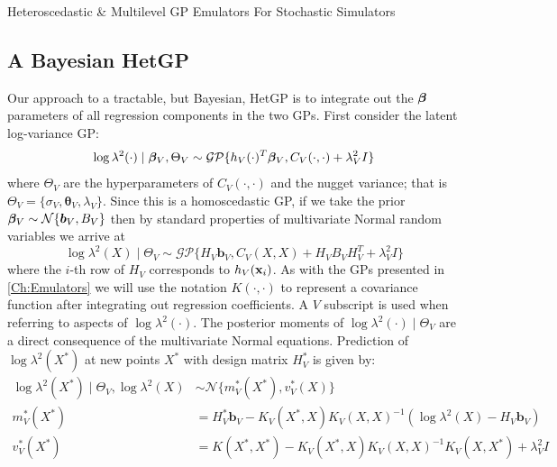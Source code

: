 \begin{chapter}{Heteroscedastic \& Multilevel GP Emulators For Stochastic Simulators\label{Ch:Hetsml}}
\subsection{A Bayesian HetGP}
Our approach to a tractable, but Bayesian, HetGP is to integrate out the $\bm{\beta}$ parameters of all regression components in the two GPs. First consider the latent log-variance GP:
\begin{equation}
	\log \lambda^2(\cdot) \mid \bm{\beta}_V, \Theta_V \sim \mathcal{GP} \{ h_V(\cdot)^T \bm{\beta}_V , C_V(\cdot, \cdot) + \lambda^2_V I\}
\end{equation}
where $\Theta_V$ are the hyperparameters of $C_V(\cdot, \cdot)$ and the nugget variance; that is $\Theta_V = \{\sigma_V, \bm{\theta}_V, \lambda_V\} $. Since this is a homoscedastic GP, if we take the prior $\bm{\beta}_V \sim \mathcal{N}\{\bm{b}_V, B_V \}$ then by standard properties of multivariate Normal random variables we arrive at
\begin{equation}
	\log \lambda^2(X) \mid \Theta_V \sim \mathcal{GP} \{ H_V \bm{b}_V , C_V(X, X) + H_V B_V H_V^T + \lambda^2_V I\}
\end{equation}
where the $i$-th row of $H_V$ corresponds to $h_V(\mathbf{x}_i)$. As with the GPs presented in \cref{Ch:Emulators} we will use the notation $K(\cdot, \cdot)$ to represent a covariance function after integrating out regression coefficients. A $V$ subscript is used when referring to aspects of $\log \lambda^2 (\cdot)$. The posterior moments of $\log \lambda^2(\cdot) \mid \Theta_V$ are a direct consequence of the multivariate Normal equations. Prediction of $\log \lambda^2(X^{*})$ at new points $X^*$ with design matrix $H^{*}_V$ is given by:
\begin{align}
	\log \lambda^2(X^*) \mid \Theta_V, \log \lambda^2(X) &\sim \mathcal{N} \{ m^*_V(X^*), v_V^*(X) \} \label{Eq:bayes-post-lambda} \\
	m_V^*(X^*) &= H^*_V \bm{b}_V - K_V(X^*, X) K_V(X, X)^{-1} (\log \lambda^2(X) - H_V \bm{b}_V)\\
	v_V^*(X^*) &= K(X^*, X^*) - K_V(X^*, X) K_V(X, X)^{-1} K_V(X, X^*) + \lambda^2_V I
\end{align}


\end{chapter}
